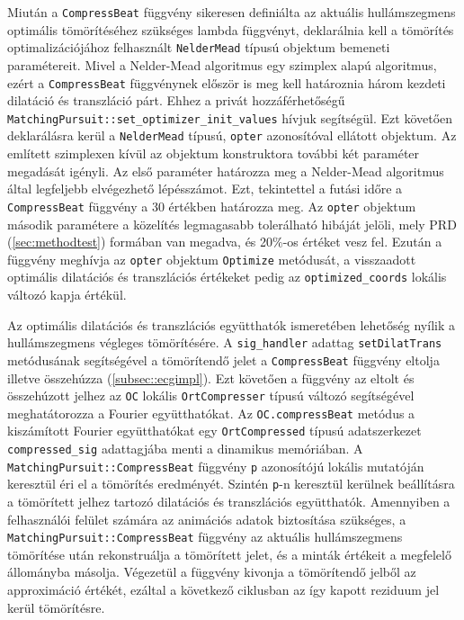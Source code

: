 \documentclass[oneside,titlepage,12pt,a4paper]{report}
\begin{document}
\par Miután a \texttt{CompressBeat} függvény sikeresen definiálta az aktuális hullámszegmens optimális tömörítéséhez szükséges lambda függvényt, deklarálnia kell a tömörítés optimalizációjához felhasznált \texttt{NelderMead} típusú objektum bemeneti paramétereit. Mivel a Nelder-Mead algoritmus egy szimplex alapú algoritmus, ezért a \texttt{CompressBeat} függvénynek először is meg kell határoznia három kezdeti dilatáció és transzláció párt. Ehhez a privát hozzáférhetőségű \texttt{MatchingPursuit::set\_optimizer\_init\_values} hívjuk segítségül. Ezt követően deklarálásra kerül a \texttt{NelderMead} típusú, \texttt{opter} azonosítóval ellátott objektum. Az említett szimplexen kívül az objektum konstruktora további két paraméter megadását igényli. Az első paraméter határozza meg a Nelder-Mead algoritmus által legfeljebb elvégezhető lépésszámot. Ezt, tekintettel a futási időre a \texttt{CompressBeat} függvény a 30 értékben határozza meg. Az \texttt{opter} objektum második paramétere a közelítés legmagasabb tolerálható hibáját jelöli, mely PRD (\ref{sec:methodtest}) formában van megadva, és 20\%-os értéket vesz fel. Ezután a függvény meghívja az \texttt{opter} objektum \texttt{Optimize} metódusát, a visszaadott optimális dilatációs és transzlációs értékeket pedig az \texttt{optimized\_coords} lokális változó kapja értékül. 
\par Az optimális dilatációs és transzlációs együtthatók ismeretében lehetőség nyílik a hullámszegmens végleges tömörítésére. A \texttt{sig\_handler} adattag \texttt{setDilatTrans} metódusának segítségével a tömörítendő jelet a \texttt{CompressBeat} függvény eltolja illetve összehúzza (\ref{subsec::ecgimpl}). Ezt követően a függvény az eltolt és összehúzott jelhez az \texttt{OC} lokális \texttt{OrtCompresser} típusú változó segítségével meghatátorozza a Fourier együtthatókat. Az \texttt{OC.compressBeat} metódus a kiszámított Fourier együtthatókat egy \texttt{OrtCompressed} típusú adatszerkezet \texttt{compressed\_sig} adattagjába menti a dinamikus memóriában. A \texttt{MatchingPursuit::CompressBeat} függvény \texttt{p} azonosítójú lokális mutatóján keresztül éri el a tömörítés eredményét. Szintén \texttt{p}-n keresztül kerülnek beállításra a tömörített jelhez tartozó dilatációs és transzlációs együtthatók. Amennyiben a felhasználói felület számára az animációs adatok biztosítása szükséges, a \linebreak \texttt{MatchingPursuit::CompressBeat} függvény az aktuális hullámszegmens tömörítése után rekonstruálja a tömörített jelet, és a minták értékeit a megfelelő állományba másolja. Végezetül a függvény kivonja a tömörítendő jelből az approximáció értékét, ezáltal a következő ciklusban az így kapott reziduum jel kerül tömörítésre. 
\end{document}

